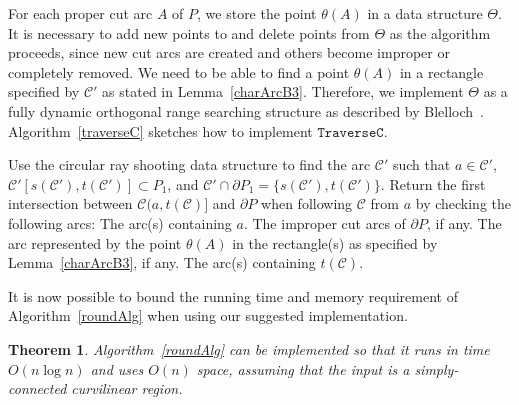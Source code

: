 \documentclass{article}
\newcommand{\ttt}[1]{\texttt{#1}}
\newcommand{\PP}{P}
\newcommand{\cut}{\mathcal C}
\newcommand{\start}{s}
\newcommand{\terminal}{t}
\newcommand{\arcA}{A}
\newtheorem{theorem}{Theorem}[section]
\begin{document}
For each proper cut arc $\arcA$ of $\PP$, we store
the point $\theta(\arcA)$ in a data structure $\Theta$.
It is necessary to add new points to and
delete points from $\Theta$ as the algorithm proceeds, since new
cut arcs are created and others become improper or completely removed.
We need to be able to find a point $\theta(\arcA)$ in a rectangle
specified by $\cut'$ as stated in Lemma~\ref{charArcB3}.
Therefore, we implement $\Theta$ as a fully dynamic orthogonal
range searching structure as described by Blelloch~\cite{blelloch2008space}.
Algorithm~\ref{traverseC} sketches how to implement $\ttt{TraverseC}$.

\begin{algorithm}[h]
\LinesNumbered
\DontPrintSemicolon
\SetArgSty{}
Use the circular ray shooting data structure to find the arc
$\cut'$ such that $a\in\cut'$, $\cut'[\start(\cut'),\terminal(\cut')]\subset\PP_1$, and 
$\cut'\cap\partial\PP_1=\{\start(\cut'),\terminal(\cut')\}$.\;
Return the first intersection between $\cut(a,\terminal(\cut)]$ and $\partial\PP$ when following $\cut$ from $a$ by checking the following arcs:\;
\quad\quad The arc(s) containing $a$.\;
\quad\quad The improper cut arcs of $\partial\PP$, if any.\;
\quad\quad The arc represented by the point $\theta(\arcA)$ in the rectangle(s) as specified by Lemma~\ref{charArcB3}, if any.\;
\quad\quad The arc(s) containing $\terminal(\cut)$.
\caption{$\ttt{TraverseC}(\cut,a)$}
\label{traverseC}
\end{algorithm}

It is now possible to bound
the running time and memory requirement
of Algorithm~\ref{roundAlg} when using our suggested implementation.

\begin{theorem}\label{finalThm}
Algorithm~\ref{roundAlg} can be implemented so that it runs in
time $O(n\log n)$ and uses $O(n)$ space, assuming that the input is a simply-connected curvilinear region.
\end{theorem}
\end{document}
